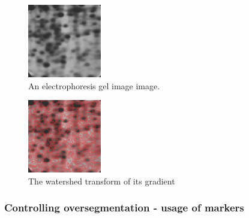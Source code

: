 \documentclass[a4paper]{article}
\begin{document}
\begin{multicols}{2}
\begin{figure}[H]
	\centering %
    	\includegraphics[height=3.2cm]{img/watershed/watershed_micro.jpg}
    \caption{An electrophoresis gel image  image.} \label{fig:watershed_electr}
\end{figure}
\columnbreak
\begin{figure}[H]
	\centering %
    	\includegraphics[height=3.2cm]{img/watershed/watershed_micro_overseg.jpg}
    \caption{The watershed transform of its gradient} \label{watershed_electr_overseg}
\end{figure}
\end{multicols}
 






\subsubsection{Controlling oversegmentation - usage of markers}
\end{document}
